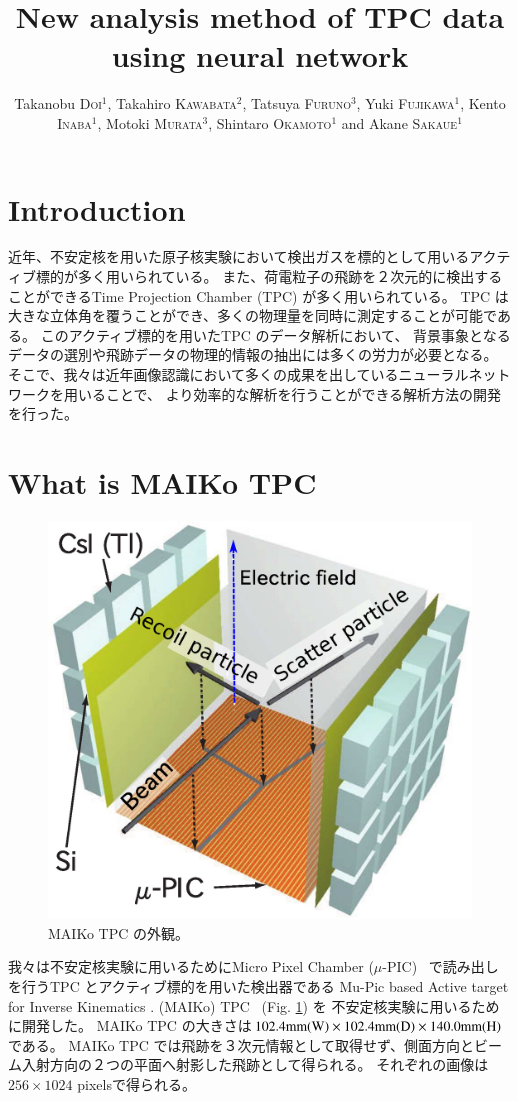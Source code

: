 \documentclass{jps-cp}
\title{New analysis method of TPC data using neural network}
\author{
  Takanobu \textsc{Doi}$^{1}$, Takahiro \textsc{Kawabata}$^{2}$, Tatsuya \textsc{Furuno}$^{3}$,
  Yuki \textsc{Fujikawa}$^{1}$, Kento \textsc{Inaba}$^{1}$, Motoki \textsc{Murata}$^{3}$,
  Shintaro \textsc{Okamoto}$^{1}$ and Akane \textsc{Sakaue}$^{1}$}
\begin{document}
\maketitle

\section{Introduction}
近年、不安定核を用いた原子核実験において検出ガスを標的として用いるアクティブ標的が多く用いられている。
また、荷電粒子の飛跡を２次元的に検出することができるTime Projection Chamber (TPC) が多く用いられている。
TPC は大きな立体角を覆うことができ、多くの物理量を同時に測定することが可能である。
このアクティブ標的を用いたTPC のデータ解析において、
背景事象となるデータの選別や飛跡データの物理的情報の抽出には多くの労力が必要となる。
そこで、我々は近年画像認識において多くの成果を出しているニューラルネットワークを用いることで、
より効率的な解析を行うことができる解析方法の開発を行った。

\section{What is MAIKo TPC}

\begin{figure}
  \begin{center}
    \includegraphics[clip, width=0.4\columnwidth]{eps/at_fig2.eps}
    \caption{MAIKo TPC の外観。}
    \label{fig:MAIKo}
  \end{center}
\end{figure}

我々は不安定核実験に用いるためにMicro Pixel Chamber ($\mu$-PIC)~\cite{mupic} 
で読み出しを行うTPC とアクティブ標的を用いた検出器である
Mu-Pic based Active target for Inverse Kinematics . (MAIKo) TPC~\cite{MAIKo} (Fig. \ref{fig:MAIKo}) を
不安定核実験に用いるために開発した。
MAIKo TPC の大きさは$102.4 \rm{mm} (\rm{W}) \times 102.4 \rm{mm} (\rm{D}) \times 140.0 \rm{mm} (\rm{H})$である。
MAIKo TPC では飛跡を３次元情報として取得せず、側面方向とビーム入射方向の２つの平面へ射影した飛跡として得られる。
それぞれの画像は$256\times 1024$ pixelsで得られる。
\end{document}
